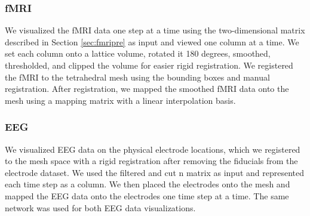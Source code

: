 \subsubsection{fMRI}

We visualized the fMRI data one step at a time using the two-dimensional matrix described in Section \ref{sec:fmripre} as input and viewed one column at a time. We set each column onto a lattice volume, rotated it 180 degrees, smoothed, thresholded, and clipped the volume for easier rigid registration. We registered the fMRI to the tetrahedral mesh using the bounding boxes and manual registration. After registration, we mapped the smoothed fMRI data onto the mesh using a mapping matrix with a linear interpolation basis.

\subsubsection{EEG}

We visualized EEG data on the physical electrode locations, which we registered to the mesh space with a rigid registration after removing the fiducials from the electrode dataset. We used the filtered and cut n matrix as input and represented each time step as a column. We then placed the electrodes onto the mesh and mapped the EEG data onto the electrodes one time step at a time. The same network was used for both EEG data visualizations.